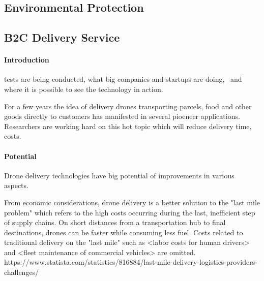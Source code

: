 \subsection{Environmental Protection}

\subsection{B2C Delivery Service} \cite{Watts2012}


\paragraph{Introduction}
tests are being conducted, 
what big companies and startups are doing, \
and where it is possible to see the technology in action.


For a few years the idea of 
delivery drones transporting parcels, food and other goods
directly to customers
has manifested in several pioeneer applications. 
Researchers are working hard on this hot topic
which will reduce delivery time,
costs.

\paragraph{Potential}
Drone delivery technologies have big potential
of improvements in various aspects.

From economic considerations,
drone delivery is a better solution to the "last mile problem"
which refers to the high costs occurring during the last, inefficient step of supply chains.
On short distances from a transportation hub to final destinations,
drones can be faster while consuming less fuel. Costs related
to traditional delivery on the "last mile" such as
<labor costs for human drivers> and <fleet maintenance of commercial vehicles>
are omitted.
https://www.statista.com/statistics/816884/last-mile-delivery-logistics-providers-challenges/

